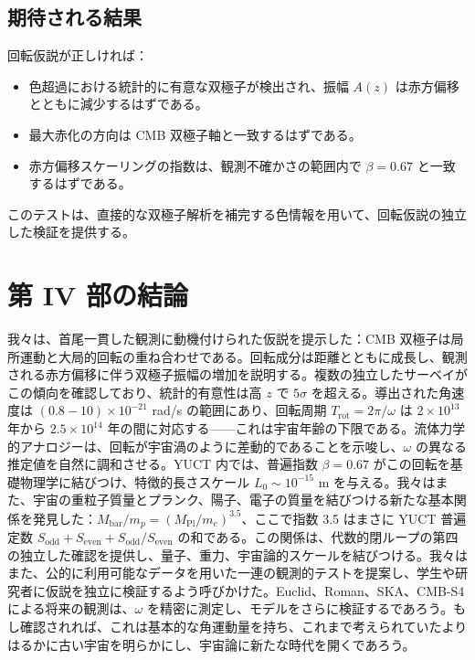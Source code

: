 \documentclass[11pt,a4paper]{article}
\begin{document}
	\subsection{期待される結果}
	
	回転仮説が正しければ：
	\begin{itemize}
		\item 色超過における統計的に有意な双極子が検出され、振幅 \(A(z)\) は赤方偏移とともに減少するはずである。
		\item 最大赤化の方向は CMB 双極子軸と一致するはずである。
		\item 赤方偏移スケーリングの指数は、観測不確かさの範囲内で \(\beta = 0.67\) と一致するはずである。
	\end{itemize}
	
	このテストは、直接的な双極子解析を補完する色情報を用いて、回転仮説の独立した検証を提供する。
	
	\section{第 IV 部の結論}
	
	我々は、首尾一貫した観測に動機付けられた仮説を提示した：CMB 双極子は局所運動と大局的回転の重ね合わせである。回転成分は距離とともに成長し、観測される赤方偏移に伴う双極子振幅の増加を説明する。複数の独立したサーベイがこの傾向を確認しており、統計的有意性は高 \(z\) で \(5\sigma\) を超える。導出された角速度は \((0.8-10)\times10^{-21}\) rad/s の範囲にあり、回転周期 \(T_{\text{rot}} = 2\pi/\omega\) は \(2\times10^{13}\) 年から \(2.5\times10^{14}\) 年の間に対応する——これは宇宙年齢の下限である。流体力学的アナロジーは、回転が宇宙渦のように差動的であることを示唆し、\(\omega\) の異なる推定値を自然に調和させる。YUCT 内では、普遍指数 \(\beta = 0.67\) がこの回転を基礎物理学に結びつけ、特徴的長さスケール \(L_0 \sim 10^{-15}\) m を与える。我々はまた、宇宙の重粒子質量とプランク、陽子、電子の質量を結びつける新たな基本関係を発見した：\(M_{\mathrm{bar}}/m_p = (M_{\mathrm{Pl}}/m_e)^{3.5}\)、ここで指数 3.5 はまさに YUCT 普遍定数 \(S_{\mathrm{odd}} + S_{\mathrm{even}} + S_{\mathrm{odd}}/S_{\mathrm{even}}\) の和である。この関係は、代数的閉ループの第四の独立した確認を提供し、量子、重力、宇宙論的スケールを結びつける。我々はまた、公的に利用可能なデータを用いた一連の観測的テストを提案し、学生や研究者に仮説を独立に検証するよう呼びかけた。Euclid、Roman、SKA、CMB-S4 による将来の観測は、\(\omega\) を精密に測定し、モデルをさらに検証するであろう。もし確認されれば、これは基本的な角運動量を持ち、これまで考えられていたよりはるかに古い宇宙を明らかにし、宇宙論に新たな時代を開くであろう。
	
\end{document}

